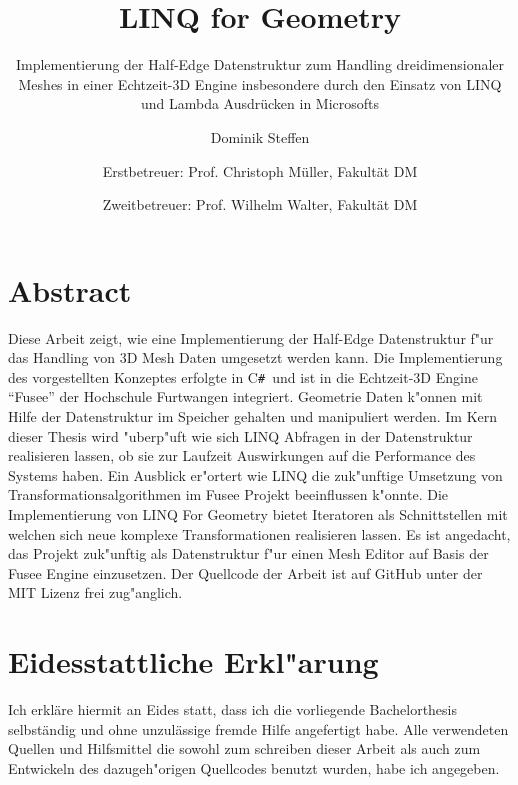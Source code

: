 \documentclass[pagesize, paper=a4, fontsize=12pt,titlepage=true, headings=small, headnosepline, abstractoff, liststotoc, nochapterprefix, plainheadsepline]{scrreprt}
\author{
Dominik Steffen \and
Erstbetreuer: Prof. Christoph Müller, Fakultät DM \and
Zweitbetreuer: Prof. Wilhelm Walter, Fakultät DM
}
\title{LINQ for Geometry}
\subtitle{Implementierung der Half-Edge Datenstruktur zum Handling dreidimensionaler Meshes in einer Echtzeit-3D Engine insbesondere durch den Einsatz von LINQ und Lambda Ausdrücken in Microsofts \CS}
\newcommand{\CSS}{C\texttt{\# }}
\newcommand{\LFGS}{LINQ For Geometry }
\begin{document}
{}



\begingroup

\newpage
\pagestyle{empty}
\chapter*{Abstract}%
Diese Arbeit zeigt, wie eine Implementierung der Half-Edge Datenstruktur f"ur das Handling von 3D Mesh Daten umgesetzt werden kann. Die Implementierung des vorgestellten Konzeptes erfolgte in \CSS und ist in die Echtzeit-3D Engine "`Fusee"' der Hochschule Furtwangen integriert. Geometrie Daten k"onnen mit Hilfe der Datenstruktur im Speicher gehalten und manipuliert werden. Im Kern dieser Thesis wird "uberp"uft wie sich LINQ Abfragen in der Datenstruktur realisieren lassen, ob sie  zur Laufzeit Auswirkungen auf die Performance des Systems haben. Ein Ausblick er"ortert wie LINQ die zuk"unftige Umsetzung von Transformationsalgorithmen im Fusee Projekt beeinflussen k"onnte. Die Implementierung von \LFGS bietet Iteratoren als Schnittstellen mit welchen sich neue komplexe Transformationen realisieren lassen. Es ist angedacht, das Projekt zuk"unftig als Datenstruktur f"ur einen Mesh Editor auf Basis der Fusee Engine einzusetzen. Der Quellcode der Arbeit ist auf GitHub unter der MIT Lizenz frei zug"anglich.
\clearpage
\endgroup

\begingroup

\newpage
\pagestyle{empty}
\chapter*{Eidesstattliche Erkl"arung}%
Ich erkläre hiermit an Eides statt, dass ich die vorliegende Bachelorthesis selbständig und ohne 
unzulässige fremde Hilfe angefertigt habe. Alle verwendeten Quellen und Hilfsmittel die sowohl zum schreiben dieser Arbeit als auch zum Entwickeln des dazugeh"origen Quellcodes benutzt wurden, habe ich angegeben.
\end{document}
